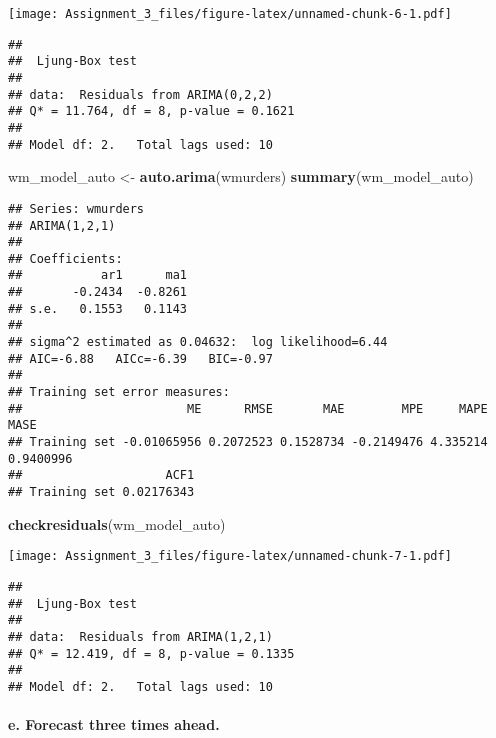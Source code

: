 \documentclass[]{article}
\newenvironment{Shaded}{\begin{snugshade}}{\end{snugshade}}
\newcommand{\KeywordTok}[1]{\textcolor[rgb]{0.13,0.29,0.53}{\textbf{#1}}}
\newcommand{\DataTypeTok}[1]{\textcolor[rgb]{0.13,0.29,0.53}{#1}}
\newcommand{\DecValTok}[1]{\textcolor[rgb]{0.00,0.00,0.81}{#1}}
\newcommand{\StringTok}[1]{\textcolor[rgb]{0.31,0.60,0.02}{#1}}
\newcommand{\OperatorTok}[1]{\textcolor[rgb]{0.81,0.36,0.00}{\textbf{#1}}}
\newcommand{\NormalTok}[1]{#1}
\let\oldparagraph\paragraph
\renewcommand{\paragraph}[1]{\oldparagraph{#1}\mbox{}}
\begin{document}
\texttt{[image: Assignment\_3\_files/figure-latex/unnamed-chunk-6-1.pdf]}

\begin{verbatim}
## 
##  Ljung-Box test
## 
## data:  Residuals from ARIMA(0,2,2)
## Q* = 11.764, df = 8, p-value = 0.1621
## 
## Model df: 2.   Total lags used: 10
\end{verbatim}

\begin{Shaded}
\begin{Highlighting}[]
\NormalTok{wm_model_auto <-}\StringTok{ }\KeywordTok{auto.arima}\NormalTok{(wmurders)}
\KeywordTok{summary}\NormalTok{(wm_model_auto)}
\end{Highlighting}
\end{Shaded}

\begin{verbatim}
## Series: wmurders 
## ARIMA(1,2,1) 
## 
## Coefficients:
##           ar1      ma1
##       -0.2434  -0.8261
## s.e.   0.1553   0.1143
## 
## sigma^2 estimated as 0.04632:  log likelihood=6.44
## AIC=-6.88   AICc=-6.39   BIC=-0.97
## 
## Training set error measures:
##                       ME      RMSE       MAE        MPE     MAPE      MASE
## Training set -0.01065956 0.2072523 0.1528734 -0.2149476 4.335214 0.9400996
##                    ACF1
## Training set 0.02176343
\end{verbatim}

\begin{Shaded}
\begin{Highlighting}[]
\KeywordTok{checkresiduals}\NormalTok{(wm_model_auto)}
\end{Highlighting}
\end{Shaded}

\texttt{[image: Assignment\_3\_files/figure-latex/unnamed-chunk-7-1.pdf]}

\begin{verbatim}
## 
##  Ljung-Box test
## 
## data:  Residuals from ARIMA(1,2,1)
## Q* = 12.419, df = 8, p-value = 0.1335
## 
## Model df: 2.   Total lags used: 10
\end{verbatim}

\paragraph{e. Forecast three times
ahead.}\label{e.-forecast-three-times-ahead.}

\begin{Shaded}
\end{Shaded}
\end{document}
